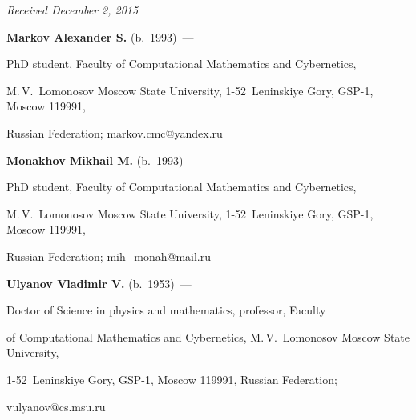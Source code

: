 \vspace*{-3pt}



\hfill{\small\textit{Received December 2, 2015}}







\Contr



\noindent

\textbf{Markov Alexander S.} (b.\ 1993)~--- 

PhD student, Faculty of Computational Mathematics and Cybernetics,  

M.\,V.~Lomonosov Moscow State University, 1-52~Leninskiye Gory, GSP-1, Moscow 119991, 

Russian Federation; \mbox{markov.cmc@yandex.ru}



\vspace*{3pt}



\noindent

\textbf{Monakhov Mikhail M.} (b.\ 1993)~---

PhD student, Faculty of Computational Mathematics and Cybernetics,  

M.\,V.~Lomonosov Moscow State University, 1-52~Leninskiye Gory, GSP-1, Moscow 119991, 

Russian Federation; \mbox{mih\_monah@mail.ru}



\vspace*{3pt}



\noindent

\textbf{Ulyanov Vladimir V.} (b.\ 1953)~---

Doctor of Science in physics and mathematics, professor, Faculty 

of Computational Mathematics and Cybernetics,  M.\,V.~Lomonosov Moscow State University, 

1-52~Leninskiye Gory, GSP-1, Moscow 119991, Russian Federation; 

\mbox{vulyanov@cs.msu.ru}



\label{end\stat}





\renewcommand{\bibname}{\protect\rm Литература}

